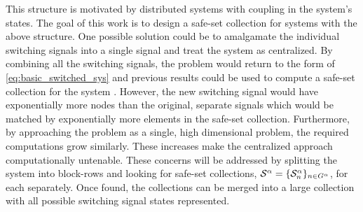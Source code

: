 This structure is motivated by distributed systems with coupling in the system's states. The goal of this work is to design a safe-set collection for systems with the above structure. One possible solution could be to amalgamate the individual switching signals into a single signal and treat the system as centralized. By combining all the switching signals, the problem would return to the form of \autoref{eq:basic_switched_sys} and previous results could be used to compute a safe-set collection for the system \cite{Danielson2019}. However, the new switching signal would have exponentially more nodes than the original, separate signals which would be matched by exponentially more elements in the safe-set collection. Furthermore, by approaching the problem as a single, high dimensional problem, the required computations grow similarly. These increases make the centralized approach computationally untenable. These concerns will be addressed by splitting the system into block-rows and looking for safe-set collections, $\mathcal{S}^{\agentidx}=\{\mathcal{S}^\agentidx_n\}_{n\in\gnumnodes[\agentidx]}$, for each separately. Once found, the collections can be merged into a large collection with all possible switching signal states represented.

